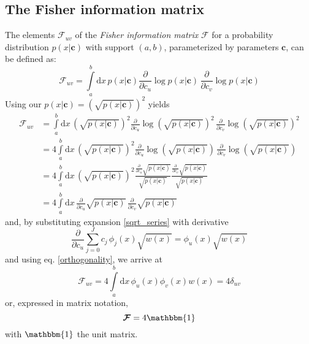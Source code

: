 \documentclass[]{report}
\begin{document}
		\subsection{The Fisher information matrix}
		The elements $\mathcal{F}_{uv}$ of the \emph{Fisher information matrix} $\bm{\mathcal{F}}$ for a probability distribution $p(x\vert\mathbf{c})$ with support $(a,b)$, parameterized by parameters $\mathbf{c}$, can be defined as:
		\begin{equation}
			\mathcal{F}_{uv} = \int\limits_a^b\mathrm{d}x\,p(x\vert\mathbf{c})\frac{\partial}{\partial c_u}\log p(x\vert\mathbf{c})\,\frac{\partial}{\partial c_v}\log p(x\vert\mathbf{c})
		\end{equation}
		Using our $p(x\vert\mathbf{c})=\left(\sqrt{p(x\vert\mathbf{c})}\right)^2$ yields
		\begin{align*}
			\mathcal{F}_{uv} & =  	\int\limits_a^b\mathrm{d}x\,\left(\sqrt{p(x\vert\mathbf{c})}\right)^2\frac{\partial}{\partial c_u}\log \left(\sqrt{p(x\vert\mathbf{c})}\right)^2\,\frac{\partial}{\partial c_v}\log \left(\sqrt{p(x\vert\mathbf{c})}\right)^2 \\
			& =  4\int\limits_a^b\mathrm{d}x\,\left(\sqrt{p(x\vert\mathbf{c})}\right)^2 \frac{\partial}{\partial c_u}\log \left(\sqrt{p(x\vert\mathbf{c})}\right)\,\frac{\partial}{\partial c_v}\log \left(\sqrt{p(x\vert\mathbf{c})}\right) \\
			& =  4 \int\limits_a^b\mathrm{d}x\,\left(\sqrt{p(x\vert\mathbf{c})}\right)^2\frac{\frac{\partial}{\partial c_u}\sqrt{p(x\vert\mathbf{c})}}{\sqrt{p(x\vert\mathbf{c})}}\frac{\frac{\partial}{\partial c_v}\sqrt{p(x\vert\mathbf{c})}}{\sqrt{p(x\vert\mathbf{c})}} \\
			& =  4\int\limits_a^b\mathrm{d}x\,\frac{\partial}{\partial c_u}\sqrt{p(x\vert\mathbf{c})}\,\frac{\partial}{\partial c_v}\sqrt{p(x\vert\mathbf{c})}
		\end{align*}
		and, by substituting expansion \ref{sqrt_series} with derivative
		\begin{equation}\label{gradient_sqrtp}
			\frac{\partial}{\partial c_u}\sum_{j=0}^{J}c_j\,\phi_j(x)\sqrt{w(x)} = \phi_u(x)\sqrt{w(x)}
		\end{equation}
		and using eq. \ref{orthogonality}, we arrive at
		\begin{equation*}
			\mathcal{F}_{uv} = 4\int\limits_a^b\mathrm{d}x\,\phi_u(x)\phi_v(x)w(x) = 4\delta_{uv}
		\end{equation*}
		or, expressed in matrix notation,
		\begin{equation}\label{fisher_direct}
			\bm{\mathcal{F}} = 4\mathbbm{1}
		\end{equation}
		with $\mathbbm{1}$ the unit matrix.
		
\end{document}
